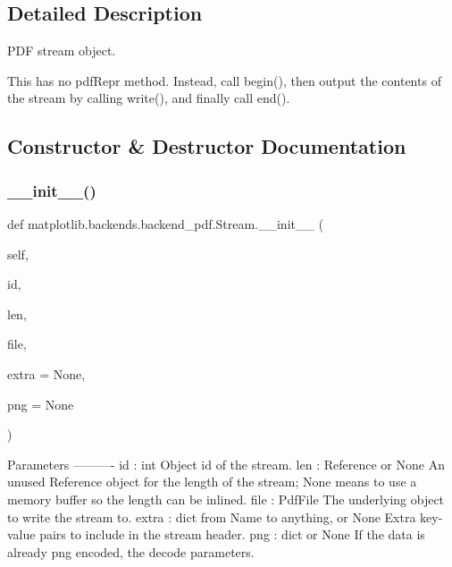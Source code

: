 \subsection{Detailed Description}
\begin{DoxyVerb}PDF stream object.

This has no pdfRepr method. Instead, call begin(), then output the
contents of the stream by calling write(), and finally call end().
\end{DoxyVerb}
 

\subsection{Constructor \& Destructor Documentation}
\mbox{\label{classmatplotlib_1_1backends_1_1backend__pdf_1_1Stream_adda86c35662f554973c6ede5621614e0}} 
\subsubsection{\texorpdfstring{\+\_\+\+\_\+init\+\_\+\+\_\+()}{\_\_init\_\_()}}
{\footnotesize\ttfamily def matplotlib.\+backends.\+backend\+\_\+pdf.\+Stream.\+\_\+\+\_\+init\+\_\+\+\_\+ (\begin{DoxyParamCaption}\item[{}]{self,  }\item[{}]{id,  }\item[{}]{len,  }\item[{}]{file,  }\item[{}]{extra = {\ttfamily None},  }\item[{}]{png = {\ttfamily None} }\end{DoxyParamCaption})}

\begin{DoxyVerb}Parameters
----------
id : int
    Object id of the stream.
len : Reference or None
    An unused Reference object for the length of the stream;
    None means to use a memory buffer so the length can be inlined.
file : PdfFile
    The underlying object to write the stream to.
extra : dict from Name to anything, or None
    Extra key-value pairs to include in the stream header.
png : dict or None
    If the data is already png encoded, the decode parameters.
\end{DoxyVerb}
 


